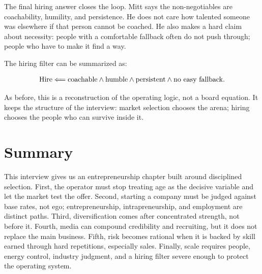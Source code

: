 The final hiring answer closes the loop. Mitt says the non-negotiables are coachability, humility, and persistence. He does not care how talented someone was elsewhere if that person cannot be coached. He also makes a hard claim about necessity: people with a comfortable fallback often do not push through; people who have to make it find a way.

The hiring filter can be summarized as:

\begin{equation}
  \hbox{Hire}
  \Longleftarrow
  \hbox{coachable}
  \wedge
  \hbox{humble}
  \wedge
  \hbox{persistent}
  \wedge
  \hbox{no easy fallback}.
\end{equation}

As before, this is a reconstruction of the operating logic, not a board equation. It keeps the structure of the interview: market selection chooses the arena; hiring chooses the people who can survive inside it.

\section{Summary}

This interview gives us an entrepreneurship chapter built around disciplined selection. First, the operator must stop treating age as the decisive variable and let the market test the offer. Second, starting a company must be judged against base rates, not ego; entrepreneurship, intrapreneurship, and employment are distinct paths. Third, diversification comes after concentrated strength, not before it. Fourth, media can compound credibility and recruiting, but it does not replace the main business. Fifth, risk becomes rational when it is backed by skill earned through hard repetitions, especially sales. Finally, scale requires people, energy control, industry judgment, and a hiring filter severe enough to protect the operating system.